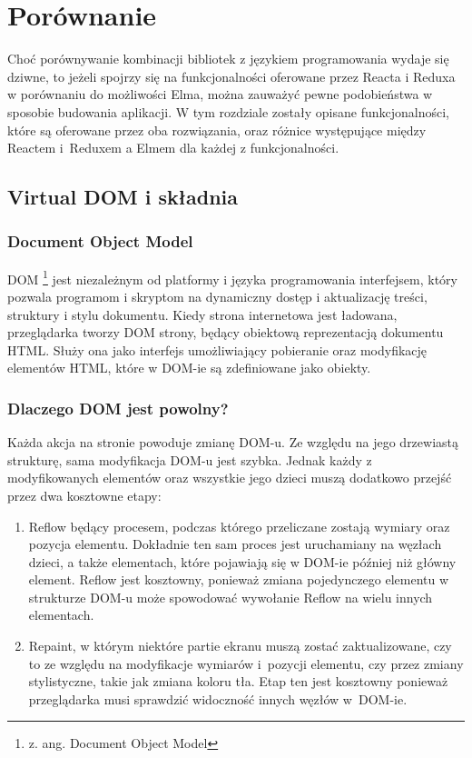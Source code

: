 \chapter{Porównanie} \label{chap:porownanie}
Choć porównywanie kombinacji bibliotek z językiem programowania wydaje się dziwne, to jeżeli spojrzy się na funkcjonalności oferowane przez Reacta i Reduxa w porównaniu do możliwości Elma, można zauważyć pewne podobieństwa w sposobie budowania aplikacji. W tym rozdziale zostały opisane funkcjonalności, które są oferowane przez oba rozwiązania, oraz różnice występujące między Reactem i~Reduxem a Elmem dla każdej z funkcjonalności.

\section{Virtual DOM i składnia}
\subsection{Document Object Model}
DOM \footnote{z. ang. Document Object Model} jest niezależnym od platformy i języka programowania interfejsem, który pozwala programom i skryptom na dynamiczny dostęp i aktualizację treści, struktury i stylu dokumentu. Kiedy strona internetowa jest ładowana, przeglądarka tworzy DOM strony, będący obiektową reprezentacją dokumentu HTML. Służy ona jako interfejs umożliwiający pobieranie oraz modyfikację elementów HTML, które w DOM-ie są zdefiniowane jako obiekty.

\subsection{Dlaczego DOM jest powolny?}
Każda akcja na stronie powoduje zmianę DOM-u. Ze względu na jego drzewiastą strukturę, sama modyfikacja DOM-u jest szybka. Jednak każdy z modyfikowanych elementów oraz wszystkie jego dzieci muszą dodatkowo przejść przez dwa kosztowne etapy:
\begin{enumerate}
	\item Reflow będący procesem, podczas którego przeliczane zostają wymiary oraz pozycja elementu. Dokładnie ten sam proces jest uruchamiany na węzłach dzieci, a także elementach, które pojawiają się w DOM-ie później niż główny element. Reflow jest kosztowny, ponieważ zmiana pojedynczego elementu w strukturze DOM-u może spowodować wywołanie Reflow na wielu innych elementach.
	\item Repaint, w którym niektóre partie ekranu muszą zostać zaktualizowane, czy to ze względu na modyfikacje wymiarów i~pozycji elementu, czy przez zmiany stylistyczne, takie jak zmiana koloru tła. Etap ten jest kosztowny ponieważ przeglądarka musi sprawdzić widoczność innych węzłów w~DOM-ie.
\end{enumerate} 

